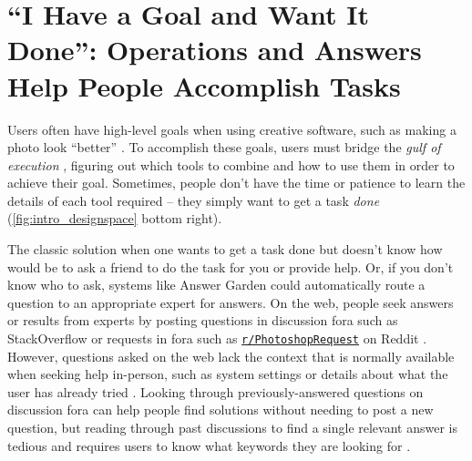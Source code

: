 \section{``I Have a Goal and Want It Done'': Operations and Answers Help People Accomplish Tasks}
Users often have high-level goals when using creative software, such as making a photo look ``better'' \cite{Laput2013}. To accomplish these goals, users must bridge the \textit{gulf of execution} \cite{Hutchins1985}, figuring out which tools to combine and how to use them in order to achieve their goal. Sometimes, people don't have the time or patience to learn the details of each tool required -- they simply want to get a task \textit{done} \cite{Laput2013, Manuvirakurike2018} (\autoref{fig:intro_designspace} bottom right). 

The classic solution when one wants to get a task done but doesn't know how would be to ask a friend to do the task for you or provide help. Or, if you don't know who to ask, systems like Answer Garden \cite{Ackerman1990} could automatically route a question to an appropriate expert for answers. On the web, people seek answers or results from experts by posting questions in discussion fora such as StackOverflow or requests in fora such as \href{https://www.reddit.com/r/PhotoshopRequest/}{\nolinkurl{r/PhotoshopRequest}} on Reddit \cite{Manuvirakurike2018}. However, questions asked on the web lack the context that is normally available when seeking help in-person, such as system settings or details about what the user has already tried \cite{Asaduzzaman2013, Chen2017}. Looking through previously-answered questions on discussion fora can help people find solutions without needing to post a new question, but reading through past discussions to find a single relevant answer is tedious and requires users to know what keywords they are looking for \cite{Chilana2012}. 

